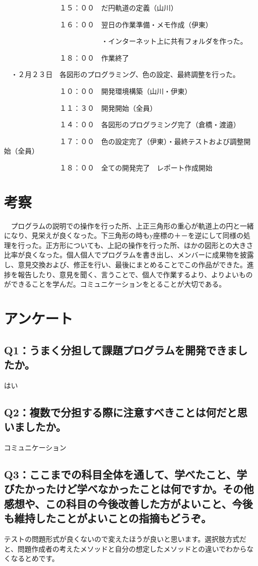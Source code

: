 \documentclass[12pt,a4j]{jarticle}
\begin{document}
　　　　　　　　１５：００　だ円軌道の定義（山川）
        
　　　　　　　　１６：００　翌日の作業準備・メモ作成（伊東）
        
　　　　　　　　　　　　　　・インターネット上に共有フォルダを作った。
              
　　　　　　　　１８：００　作業終了
        
　・２月２３日　各図形のプログラミング、色の設定、最終調整を行った。
 
　　　　　　　　１０：００　開発環境構築（山川・伊東）
        
　　　　　　　　１１：３０　開発開始（全員）
        
　　　　　　　　１４：００　各図形のプログラミング完了（倉橋・渡邉）
        
　　　　　　　　１７：００　色の設定完了（伊東）・最終テストおよび調整開始（全員）
        
　　　　　　　　１８：００　全ての開発完了　レポート作成開始

\section{考察}

　プログラムの説明での操作を行った所、上正三角形の重心が軌道上の円と一緒になり、見栄えが良くなった。下三角形の時もy座標の＋－を逆にして同様の処理を行った。正方形についても、上記の操作を行った所、ほかの図形との大きさ比率が良くなった。個人個人でプログラムを書き出し、メンバーに成果物を披露し、意見交換および、修正を行い、最後にまとめることでこの作品ができた。進捗を報告したり、意見を聞く、言うことで、個人で作業するより、よりよいものができることを学んだ。コミュニケーションをとることが大切である。

\section{アンケート}

\subsection{Q1：うまく分担して課題プログラムを開発できましたか。}
はい

\subsection{Q2：複数で分担する際に注意すべきことは何だと思いましたか。}
コミュニケーション

\subsection{Q3：ここまでの科目全体を通して、学べたこと、学びたかったけど学べなかったことは何ですか。その他感想や、この科目の今後改善した方がよいこと、今後も維持したことがよいことの指摘もどうぞ。}
テストの問題形式が良くないので変えたほうが良いと思います。選択肢方式だと、問題作成者の考えたメソッドと自分の想定したメソッドとの違いでわからなくなるとめです。
\end{document}
